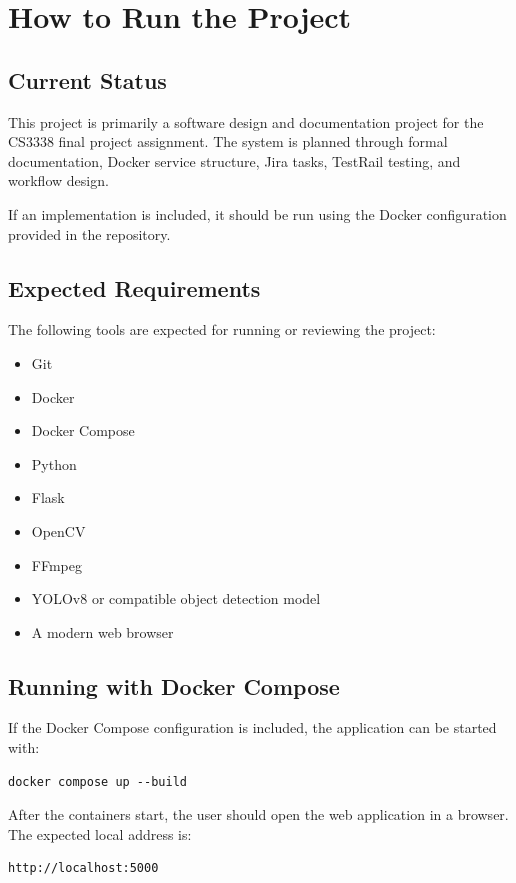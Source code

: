 \documentclass[12pt]{article}
\begin{document}
\section{How to Run the Project}

\subsection{Current Status}
This project is primarily a software design and documentation project for the CS3338 final project assignment. The system is planned through formal documentation, Docker service structure, Jira tasks, TestRail testing, and workflow design.

If an implementation is included, it should be run using the Docker configuration provided in the repository.

\subsection{Expected Requirements}
The following tools are expected for running or reviewing the project:

\begin{itemize}[noitemsep]
    \item Git
    \item Docker
    \item Docker Compose
    \item Python
    \item Flask
    \item OpenCV
    \item FFmpeg
    \item YOLOv8 or compatible object detection model
    \item A modern web browser
\end{itemize}

\subsection{Running with Docker Compose}
If the Docker Compose configuration is included, the application can be started with:

\begin{verbatim}
docker compose up --build
\end{verbatim}

After the containers start, the user should open the web application in a browser. The expected local address is:

\begin{verbatim}
http://localhost:5000
\end{verbatim}
\end{document}
